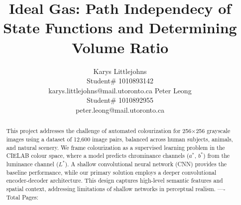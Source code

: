 \documentclass{article} %
\title{Ideal Gas: Path Independecy of State Functions and Determining Volume Ratio}
\author{Karys Littlejohns\\
Student\# 1010893142 \\
karys.littlejohns@mail.utoronto.ca
\And
Peter Leong \\
Student\# 1010892955 \\
peter.leong@mail.utoronto.ca 
}
\begin{document}
\maketitle

\vspace{-6ex}

\begin{abstract}
This project addresses the challenge of automated colourization for 256$\times$256 grayscale images using a dataset of 12,600 image pairs, balanced across human subjects, 
animals, and natural scenery. We frame colourization as a supervised learning problem in the CIELAB colour space, where a model predicts chrominance channels ($a^*$, $b^*$) 
from the luminance channel ($L^*$). A shallow convolutional neural network (CNN) provides the baseline performance, while our primary solution employs a deeper convolutional 
encoder-decoder architecture. This design captures high-level semantic features and spatial context, addressing limitations of shallow networks in perceptual realism.
----Total Pages: \pageref{last_page}
\end{abstract}

\vspace{2ex}
\end{document}

